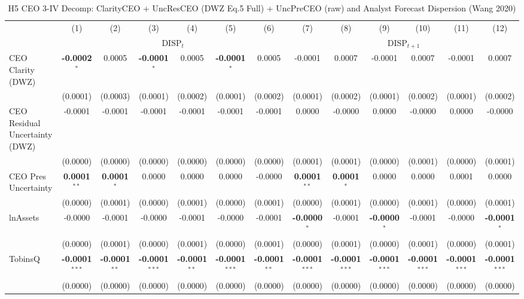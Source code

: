 \documentclass[11pt,a4paper]{article}
\begin{document}
\begin{table}[htbp]
\centering
\caption{H5 CEO 3-IV Decomp: ClarityCEO + UncResCEO (DWZ Eq.5 Full) + UncPreCEO (raw) and Analyst Forecast Dispersion (Wang 2020)}
\label{tab:h5_ceo2_decomp}
\scriptsize
\begin{tabular}{lcccccccccccc}
\toprule
 & (1) & (2) & (3) & (4) & (5) & (6) & (7) & (8) & (9) & (10) & (11) & (12) \\
 & \multicolumn{6}{c}{DISP$_{t}$} & \multicolumn{6}{c}{DISP$_{t+1}$} \\
\cmidrule(lr){2-7} \cmidrule(lr){8-13}
\midrule
CEO Clarity (DWZ) & \textbf{-0.0002}$^{*}$ & 0.0005 & \textbf{-0.0001}$^{*}$ & 0.0005 & \textbf{-0.0001}$^{*}$ & 0.0005 & -0.0001 & 0.0007 & -0.0001 & 0.0007 & -0.0001 & 0.0007 \\
 & (0.0001) & (0.0003) & (0.0001) & (0.0002) & (0.0001) & (0.0002) & (0.0001) & (0.0002) & (0.0001) & (0.0002) & (0.0001) & (0.0002) \\
CEO Residual Uncertainty (DWZ) & -0.0001 & -0.0001 & -0.0001 & -0.0001 & -0.0001 & -0.0001 & 0.0000 & -0.0000 & 0.0000 & -0.0000 & 0.0000 & -0.0000 \\
 & (0.0000) & (0.0000) & (0.0000) & (0.0000) & (0.0000) & (0.0000) & (0.0001) & (0.0001) & (0.0000) & (0.0001) & (0.0000) & (0.0001) \\
CEO Pres Uncertainty & \textbf{0.0001}$^{**}$ & \textbf{0.0001}$^{*}$ & 0.0000 & 0.0000 & 0.0000 & -0.0000 & \textbf{0.0001}$^{**}$ & \textbf{0.0001}$^{*}$ & 0.0000 & 0.0000 & 0.0001 & 0.0000 \\
 & (0.0000) & (0.0001) & (0.0000) & (0.0001) & (0.0000) & (0.0001) & (0.0000) & (0.0001) & (0.0000) & (0.0001) & (0.0000) & (0.0001) \\
\midrule
lnAssets & -0.0000 & -0.0001 & -0.0000 & -0.0001 & -0.0000 & -0.0001 & \textbf{-0.0000}$^{*}$ & -0.0001 & \textbf{-0.0000}$^{*}$ & -0.0001 & -0.0000 & \textbf{-0.0001}$^{*}$ \\
 & (0.0000) & (0.0001) & (0.0000) & (0.0001) & (0.0000) & (0.0001) & (0.0000) & (0.0001) & (0.0000) & (0.0001) & (0.0000) & (0.0001) \\
TobinsQ & \textbf{-0.0001}$^{***}$ & \textbf{-0.0001}$^{**}$ & \textbf{-0.0001}$^{***}$ & \textbf{-0.0001}$^{**}$ & \textbf{-0.0001}$^{***}$ & \textbf{-0.0001}$^{**}$ & \textbf{-0.0001}$^{***}$ & \textbf{-0.0001}$^{***}$ & \textbf{-0.0001}$^{***}$ & \textbf{-0.0001}$^{***}$ & \textbf{-0.0001}$^{***}$ & \textbf{-0.0001}$^{***}$ \\
 & (0.0000) & (0.0000) & (0.0000) & (0.0000) & (0.0000) & (0.0000) & (0.0000) & (0.0000) & (0.0000) & (0.0000) & (0.0000) & (0.0000) \\

\end{tabular}
\end{table}
\end{document}

